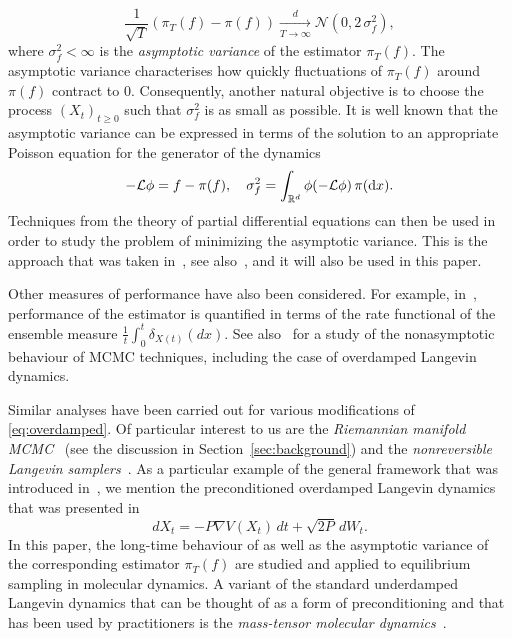$$
	\frac{1}{\sqrt{T}}\left(\pi_T(f) - \pi(f)\right) \xrightarrow[T\rightarrow\infty]{d} \mathcal{N}(0, 2\,\sigma^2_f),
$$
where $\sigma^2_f < \infty$ is the \emph{asymptotic variance} of the estimator $\pi_T(f)$. The asymptotic variance characterises how quickly fluctuations of $\pi_T(f)$ around $\pi(f)$ contract to $0$. Consequently, another natural objective is to choose the process $(X_t)_{t\ge0}$ such that $\sigma^2_f$ is as small as possible. It is well known that the asymptotic variance can be expressed in terms of the solution to an appropriate Poisson equation for the generator of the dynamics~\cite{KomorowskiLandimOlla2012}
\begin{equation}\label{e:poisson}
- \mathcal L \phi = f - \pi (f), \quad \sigma^2_f = \int_{\mathbb{R}^d} \phi (- \mathcal L \phi) \, \pi(\mathrm{d}x).
\end{equation}
Techniques from the theory of partial differential equations can then be used in order to study the problem of minimizing the asymptotic variance. This is the approach that was taken in~\cite{duncan2016variance}, see also~\cite{asvar_Hwang}, and it will also be used in this paper.  

Other measures of performance have also been considered.  For example, in~\cite{LDgraphs,LargeDeviations}, performance of the estimator is quantified in terms of the rate functional of the ensemble measure $\frac{1}{t}\int_0^t \delta_{X(t)}(dx)$. See also~\cite{JoulinOllivier2010} for a study of the nonasymptotic behaviour of MCMC techniques, including the case of overdamped Langevin dynamics.  

Similar analyses have been carried out for various modifications of \eqref{eq:overdamped}. Of particular interest to us are the {\it Riemannian manifold MCMC}~\cite{GirolamiCalderhead2011} (see the discussion in Section~\ref{sec:background}) and the {\it nonreversible Langevin samplers}~\cite{Hwang1993,Hwang2005}. As a particular example of the general framework that was introduced in~\cite{GirolamiCalderhead2011}, we mention the preconditioned overdamped Langevin dynamics that was presented in~\cite{alrachid2016some} 
\begin{equation}\label{e:precond-mala}
	dX_t = -P \nabla V(X_t)\,dt + \sqrt{2P}\,dW_t.
\end{equation}
In this paper, the long-time behaviour of as well as the asymptotic variance of the corresponding estimator $\pi_T(f)$ are studied and applied to equilibrium sampling in molecular dynamics. A variant of the standard underdamped Langevin dynamics that can be thought of as a form of preconditioning and that has been used by practitioners is the {\it mass-tensor molecular dynamics}~\cite{Bennett1975267}.

